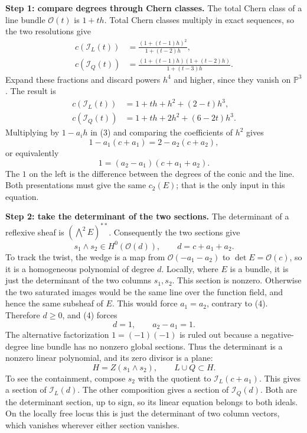 \documentclass[11pt,a4paper]{article}
\theoremstyle{remark}
\begin{document}
\textbf{Step 1: compare degrees through
Chern classes.}
The total Chern class of a line bundle
$\mathcal{O}(t)$ is $1+th$.
Total Chern classes multiply in exact
sequences, so the two resolutions give
$$
\begin{aligned}
c(\mathcal{I}_L(t))
&=\frac{(1+(t-1)h)^2}{1+(t-2)h},\\
c(\mathcal{I}_Q(t))
&=\frac{(1+(t-1)h)(1+(t-2)h)}
{1+(t-3)h}.
\end{aligned}
$$
Expand these fractions and discard
powers $h^4$ and higher, since they
vanish on $\mathbb{P}^3$. The result is
$$
\begin{aligned}
c(\mathcal{I}_L(t))
&=1+th+h^2+(2-t)h^3,\\
c(\mathcal{I}_Q(t))
&=1+th+2h^2+(6-2t)h^3.
\end{aligned}
$$
Multiplying by $1-a_i h$ in (3) and
comparing the coefficients of $h^2$
gives
$$
1-a_1(c+a_1)=2-a_2(c+a_2),
$$
or equivalently
\begin{equation}
\boxed{1=(a_2-a_1)(c+a_1+a_2).}
\end{equation}
The $1$ on the left is the difference
between the degrees of the conic and
the line. Both presentations must give
the same $c_2(E)$; that is the only
input in this equation.

\textbf{Step 2: take the determinant
of the two sections.}
The determinant of a reflexive sheaf
is $(\bigwedge^2E)^{**}$.
Consequently the two sections give
$$
s_1\wedge s_2\in
H^0(\mathcal{O}(d)),\qquad
d=c+a_1+a_2.
$$
To track the twist, the wedge is a map
from $\mathcal{O}(-a_1-a_2)$ to
$\det E=\mathcal{O}(c)$, so it is a
homogeneous polynomial of degree $d$.
Locally, where $E$ is a bundle, it is
just the determinant of the two columns
$s_1,s_2$.
This section is nonzero. Otherwise
the two saturated images would be
the same line over the function field,
and hence the same subsheaf of $E$.
This would force $a_1=a_2$, contrary
to (4). Therefore $d\geq0$, and (4)
forces
$$
d=1,\qquad a_2-a_1=1.
$$
The alternative factorization
$1=(-1)(-1)$ is ruled out because a
negative-degree line bundle has no
nonzero global sections. Thus the
determinant is a nonzero linear
polynomial, and its zero divisor is
a plane:
$$
\boxed{H=Z(s_1\wedge s_2),\qquad
L\cup Q\subset H.}
$$
To see the containment, compose $s_2$
with the quotient to
$\mathcal{I}_L(c+a_1)$.
This gives a section of
$\mathcal{I}_L(d)$.
The other composition gives a section
of $\mathcal{I}_Q(d)$.
Both are the determinant section,
up to sign, so its linear equation
belongs to both ideals.
On the locally free locus this is
just the determinant of two column
vectors, which vanishes wherever
either section vanishes.
\end{document}
